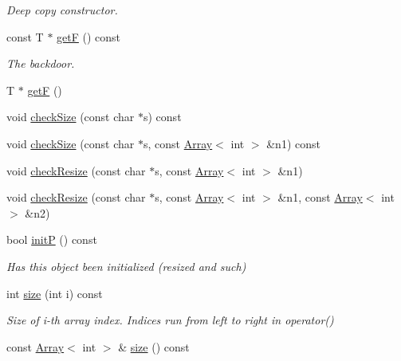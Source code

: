 \begin{DoxyCompactItemize}
\begin{DoxyCompactList}\small\item\em Deep copy constructor. \end{DoxyCompactList}\item 
const T $\ast$ \mbox{\hyperlink{classENSEM_1_1OTensor_ac9462508146fa6ceba2797c9994ea54c}{getF}} () const
\begin{DoxyCompactList}\small\item\em The backdoor. \end{DoxyCompactList}\item 
T $\ast$ \mbox{\hyperlink{classENSEM_1_1OTensor_acaf63577c9d67fe58f649ae9fac008c1}{getF}} ()
\item 
void \mbox{\hyperlink{classENSEM_1_1OTensor_a09bfbf9385ec1bbe5050d4df43850f63}{check\+Size}} (const char $\ast$s) const
\item 
void \mbox{\hyperlink{classENSEM_1_1OTensor_ac59e6465eb9803b05edcdec04f8d2370}{check\+Size}} (const char $\ast$s, const \mbox{\hyperlink{classXMLArray_1_1Array}{Array}}$<$ int $>$ \&n1) const
\item 
void \mbox{\hyperlink{classENSEM_1_1OTensor_aa273eae7f1de4b37e91302da5edf279b}{check\+Resize}} (const char $\ast$s, const \mbox{\hyperlink{classXMLArray_1_1Array}{Array}}$<$ int $>$ \&n1)
\item 
void \mbox{\hyperlink{classENSEM_1_1OTensor_a0f656f8ef2b19a258a8c86a4e80ea902}{check\+Resize}} (const char $\ast$s, const \mbox{\hyperlink{classXMLArray_1_1Array}{Array}}$<$ int $>$ \&n1, const \mbox{\hyperlink{classXMLArray_1_1Array}{Array}}$<$ int $>$ \&n2)
\item 
bool \mbox{\hyperlink{classENSEM_1_1OTensor_a3f591732bdd0b358cde1069b21fbf1f5}{initP}} () const
\begin{DoxyCompactList}\small\item\em Has this object been initialized (resized and such) \end{DoxyCompactList}\item 
int \mbox{\hyperlink{classENSEM_1_1OTensor_aeb39779caeadcbcea94d9ef629913287}{size}} (int i) const
\begin{DoxyCompactList}\small\item\em Size of i-\/th array index. Indices run from left to right in operator() \end{DoxyCompactList}\item 
const \mbox{\hyperlink{classXMLArray_1_1Array}{Array}}$<$ int $>$ \& \mbox{\hyperlink{classENSEM_1_1OTensor_aa34f5311f161a9b4aef0b08af6fb8d34}{size}} () const

\end{DoxyCompactItemize}
